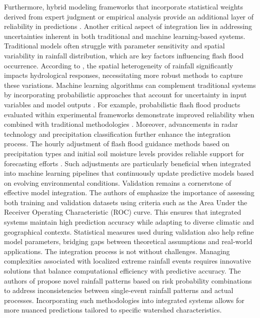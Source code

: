 Furthermore, hybrid modeling frameworks that incorporate statistical weights derived from expert judgment or empirical analysis provide an additional layer of reliability in predictions \citep{Hinge2024}. Another critical aspect of integration lies in addressing uncertainties inherent in both traditional and machine learning-based systems. Traditional models often struggle with parameter sensitivity and spatial variability in rainfall distribution, which are key factors influencing flash flood occurrence. According to \citep{Douinot2016}, the spatial heterogeneity of rainfall significantly impacts hydrological responses, necessitating more robust methods to capture these variations. Machine learning algorithms can complement traditional systems by incorporating probabilistic approaches that account for uncertainty in input variables and model outputs \citep{Yussouf2020}\citep{Yatheendradas2008}. For example, probabilistic flash flood products evaluated within experimental frameworks demonstrate improved reliability when combined with traditional methodologies \citep{Yussouf2020}.
Moreover, advancements in radar technology and precipitation classification further enhance the integration process. The hourly adjustment of flash flood guidance methods based on precipitation types and initial soil moisture levels provides reliable support for forecasting efforts \citep{Yang2022}. Such adjustments are particularly beneficial when integrated into machine learning pipelines that continuously update predictive models based on evolving environmental conditions.
Validation remains a cornerstone of effective model integration. The authors of \citep{Pham2020} emphasize the importance of assessing both training and validation datasets using criteria such as the Area Under the Receiver Operating Characteristic (ROC) curve. This ensures that integrated systems maintain high prediction accuracy while adapting to diverse climatic and geographical contexts. Statistical measures used during validation also help refine model parameters, bridging gaps between theoretical assumptions and real-world applications.
The integration process is not without challenges. Managing complexities associated with localized extreme rainfall events requires innovative solutions that balance computational efficiency with predictive accuracy. The authors of \citep{Lu2021} propose novel rainfall patterns based on risk probability combinations to address inconsistencies between single-event rainfall patterns and actual processes. Incorporating such methodologies into integrated systems allows for more nuanced predictions tailored to specific watershed characteristics.
